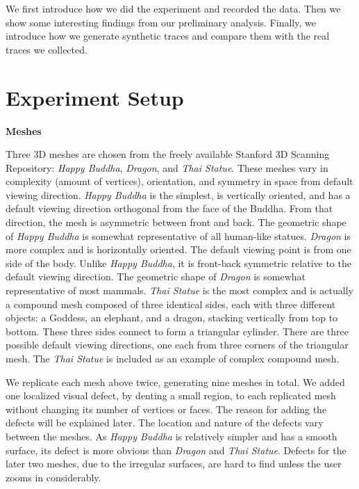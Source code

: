 We first introduce how we did the experiment and recorded the data. 
Then we show some interesting findings from our preliminary analysis. 
Finally, we introduce how we generate synthetic traces and 
compare them with the real traces we collected.

\section{Experiment Setup}
\label{s:user:study}
\textbf{Meshes}

Three 3D meshes are chosen from the freely available
Stanford 3D Scanning Repository:   %
\textit{Happy Buddha}, \textit{Dragon}, and \textit{Thai Statue}.
These meshes vary in complexity (amount of vertices), orientation, and
symmetry in space from default viewing direction. \textit{Happy Buddha} is the
simplest, is vertically oriented, and has a default viewing direction
orthogonal from the face of the Buddha. From that direction, the mesh is
asymmetric between front and back. The geometric shape of \textit{Happy Buddha} is
somewhat representative of all human-like statues. \textit{Dragon} is more complex
and is horizontally oriented. The default viewing point is from one
side of the body. Unlike \textit{Happy Buddha}, it is front-back symmetric
relative to the default viewing direction. The geometric shape of \textit{Dragon} is
somewhat representative of most mammals. \textit{Thai Statue} is the most complex
and is actually a compound mesh composed of three identical sides, each 
with three different objects: a Goddess, an elephant, and a dragon,
stacking vertically from top to bottom.  These three sides connect to
form a triangular cylinder. There are three possible default
viewing directions, one each from three corners of the triangular mesh. The
\textit{Thai Statue} is included as an example of complex compound mesh.

We replicate each mesh above twice, generating nine meshes in total.  
We added one localized visual defect, by denting a small region, to each replicated mesh 
without changing its number of vertices or faces. The reason for adding the defects will be explained later. 
The location and nature of the
defects vary between the meshes. As \textit{Happy Buddha} is
relatively simpler and has a smooth surface, its defect is
 more obvious than \textit{Dragon}
and \textit{Thai Statue}.  Defects for the later two meshes, due to the
irregular surfaces, are hard to find unless the user zooms in
considerably.

